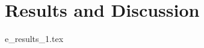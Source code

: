 \documentclass[pdftex,10pt,b5paper,twoside]{book}
\begin{document}


%
%
%


\chapter{Results and Discussion}
{e_results_1.tex}
%
\end{document}
